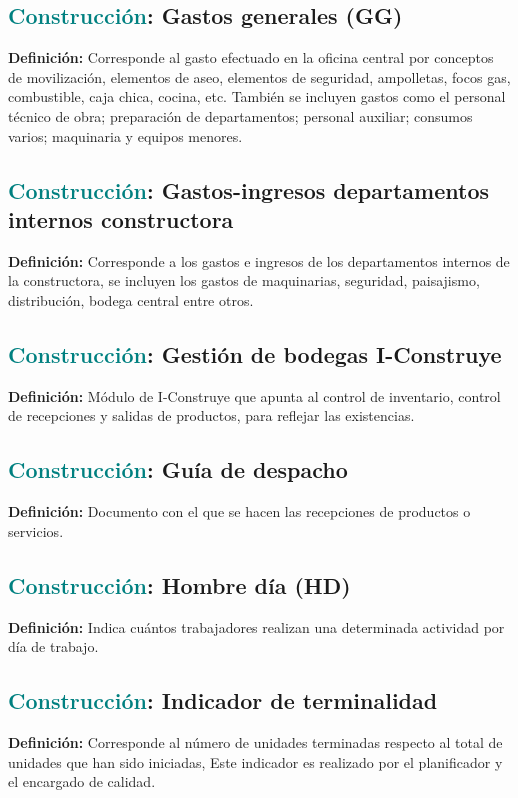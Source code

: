 \documentclass[12pt]{article}
\begin{document}
\subsection{\textcolor{teal}{Construcción}: Gastos generales (GG)}
\textbf{Definición:} Corresponde al gasto efectuado en la oficina central por conceptos de movilización, elementos de aseo, elementos de seguridad, ampolletas, focos gas, combustible, caja chica, cocina, etc. También se incluyen gastos como el personal técnico de obra; preparación de departamentos; personal auxiliar; consumos varios; maquinaria y equipos menores.
\subsection{\textcolor{teal}{Construcción}: Gastos-ingresos departamentos internos constructora}
\textbf{Definición:} Corresponde a los gastos e ingresos de los departamentos internos de la constructora, se incluyen los gastos de maquinarias, seguridad, paisajismo, distribución, bodega central entre otros.
\subsection{\textcolor{teal}{Construcción}: Gestión de bodegas I-Construye}
\textbf{Definición:} Módulo de I-Construye que apunta al control de inventario, control de recepciones y salidas de productos, para reflejar las existencias.
\subsection{\textcolor{teal}{Construcción}: Guía de despacho}
\textbf{Definición:} Documento con el que se hacen las recepciones de productos o servicios. 
\subsection{\textcolor{teal}{Construcción}: Hombre día (HD)}
\textbf{Definición:} Indica cuántos trabajadores realizan una determinada actividad por día de trabajo.
\subsection{\textcolor{teal}{Construcción}: Indicador de terminalidad}
\textbf{Definición:} Corresponde al número de unidades terminadas respecto al total de unidades que han sido iniciadas, Este indicador es realizado por el planificador y el encargado de calidad.
\end{document}
